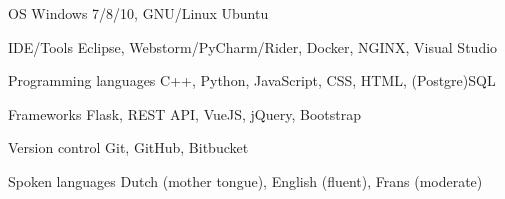 
\begin{cvskills}

  \cvskill
    {OS} %
    {Windows 7/8/10, GNU/Linux Ubuntu} %
    
      \cvskill
    {IDE/Tools} %
    {Eclipse, Webstorm/PyCharm/Rider, Docker, NGINX, Visual Studio} %
    
  \cvskill
    {Programming languages} %
    {C++, Python, JavaScript, CSS, HTML, (Postgre)SQL} %

  \cvskill
    {Frameworks} %
    {Flask, REST API, VueJS, jQuery, Bootstrap} %
    
  \cvskill
    {Version control} %
    {Git, GitHub, Bitbucket} %
    
  \cvskill
    {Spoken languages} %
    {Dutch (mother tongue), English (fluent), Frans (moderate)} %
    
\end{cvskills}
